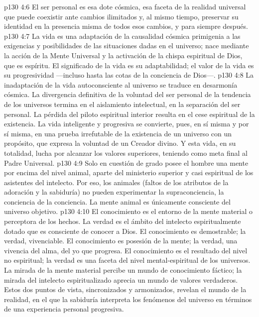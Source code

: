 \vs p130 4:6 El ser personal es esa dote cósmica, esa faceta de la realidad universal que puede coexistir ante cambios ilimitados y, al mismo tiempo, preservar su identidad en la presencia misma de todos esos cambios, y para siempre después.
\vs p130 4:7 La vida es una adaptación de la causalidad cósmica primigenia a las exigencias y posibilidades de las situaciones dadas en el universo; nace mediante la acción de la Mente Universal y la activación de la chispa espiritual de Dios, que es espíritu. El significado de la vida es su adaptabilidad; el valor de la vida es su progresividad ---incluso hasta las cotas de la conciencia de Dios---.
\vs p130 4:8 La inadaptación de la vida autoconsciente al universo se traduce en desarmonía cósmica. La divergencia definitiva de la voluntad del ser personal de la tendencia de los universos termina en el aislamiento intelectual, en la separación del ser personal. La pérdida del piloto espiritual interior resulta en el cese espiritual de la existencia. La vida inteligente y progresiva se convierte, pues, en sí misma y por sí misma, en una prueba irrefutable de la existencia de un universo con un propósito, que expresa la voluntad de un Creador divino. Y esta vida, en su totalidad, lucha por alcanzar los valores superiores, teniendo como meta final al Padre Universal.
\vs p130 4:9 Solo en cuestión de grado posee el hombre una mente por encima del nivel animal, aparte del ministerio superior y casi espiritual de los asistentes del intelecto. Por eso, los animales (faltos de los atributos de la adoración y la sabiduría) no pueden experimentar la supraconciencia, la conciencia de la conciencia. La mente animal es únicamente consciente del universo objetivo.
\vs p130 4:10 El conocimiento es el entorno de la mente material o perceptora de los hechos. La verdad es el ámbito del intelecto espiritualmente dotado que es consciente de conocer a Dios. El conocimiento es demostrable; la verdad, vivenciable. El conocimiento es posesión de la mente; la verdad, una vivencia del alma, del yo que progresa. El conocimiento es el resultado del nivel no espiritual; la verdad es una faceta del nivel mental\hyp{}espiritual de los universos. La mirada de la mente material percibe un mundo de conocimiento fáctico; la mirada del intelecto espiritualizado aprecia un mundo de valores verdaderos. Estos dos puntos de vista, sincronizados y armonizados, revelan el mundo de la realidad, en el que la sabiduría interpreta los fenómenos del universo en términos de una experiencia personal progresiva.
